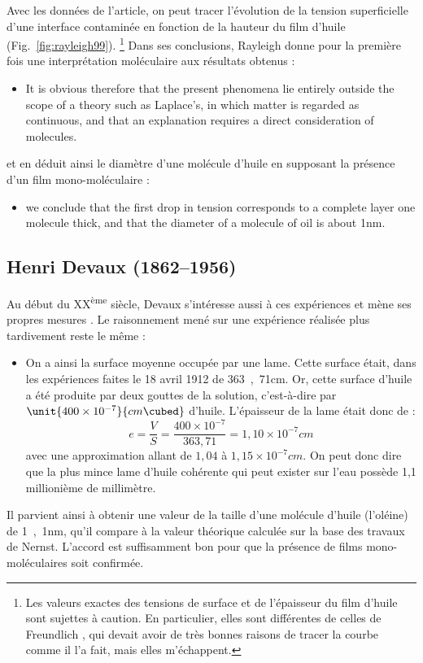 \documentclass[12pt,a4paper]{article}
\begin{document}
Avec les données de l'article, on peut tracer l'évolution de la tension superficielle d'une interface contaminée en fonction de la hauteur du film d'huile (Fig.~\ref{fig:rayleigh99}).
\footnote{Les valeurs exactes des tensions de surface et de l'épaisseur du film d'huile sont sujettes à caution.
En particulier, elles sont différentes de celles de Freundlich \cite{Freundlich1909}, qui devait avoir de très bonnes raisons de tracer la courbe comme il l'a fait, mais elles m'échappent.}
Dans ses conclusions, Rayleigh donne pour la première fois une interprétation moléculaire aux résultats obtenus :
\begin{itemize}
\item[]
\og 
It is obvious therefore that the present phenomena lie entirely outside the scope of a theory such as Laplace's, in which matter is regarded as continuous, and that an explanation requires a direct consideration of molecules.
\fg{} 
\end{itemize}
et en déduit ainsi le diamètre d'une molécule d'huile en supposant la présence d'un film mono-moléculaire :
\begin{itemize}
\item[]
\og 
[...] we conclude that the first drop in tension corresponds to a complete layer one molecule thick, and that the diameter of a molecule of oil is about \unit{1}{nm}.
\fg{} 
\end{itemize}

\subsection{Henri Devaux (1862--1956)}

Au début du XX\textsuperscript{ème} siècle, Devaux s'intéresse aussi à ces expériences et mène ses propres mesures \cite{Devaux1904}.
Le raisonnement mené sur une expérience réalisée plus tardivement reste le même \cite{Devaux1931} :
\begin{itemize}
\item[]
\og On a ainsi la surface moyenne occupée par une lame.
Cette surface était, dans les expériences faites le 18 avril 1912 de \unit{363{,}71}{cm\squared}.
Or, cette surface d'huile a été produite par deux gouttes de la solution, c'est-à-dire par $\unit{400\times10^{-7}}{cm\cubed}$ d'huile.
L'épaisseur de la lame était donc de :
\[
e = \frac{V}{S} = \frac{400\times10^{-7}}{363{,}71} = \unit{1{,}10\times10^{-7}}{cm}
\]
avec une approximation allant de $1{,}04$ à $\unit{1{,}15\times10^{-7}}{cm}$.
On peut donc dire que la plus mince lame d'huile cohérente qui peut exister sur l'eau possède 1{,}1 millionième de millimètre.
\fg{} 
\end{itemize}
Il parvient ainsi à obtenir une valeur de la taille d'une molécule d'huile (l'oléine) de \unit{1{,}1}{nm}, qu'il compare à la valeur théorique calculée sur la base des travaux de Nernst.
L'accord est suffisamment bon pour que la présence de films mono-moléculaires soit confirmée.
\end{document}
